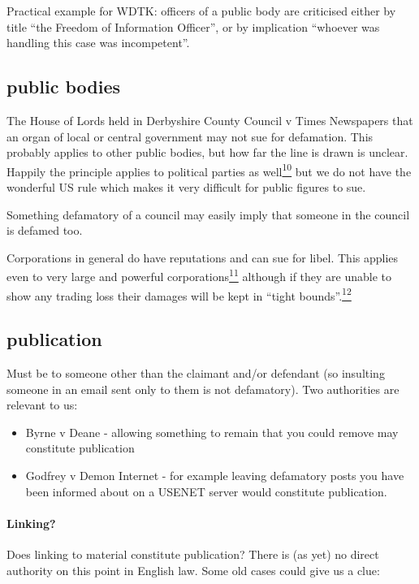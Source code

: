 \documentclass[]{article}
\begin{document}
Practical example for WDTK: officers of a public body are criticised
either by title ``the Freedom of Information Officer'', or by
implication ``whoever was handling this case was incompetent''.

\subsection{public bodies}

{The House of Lords held in Derbyshire County Council v Times Newspapers
that an organ of local or central government may not sue for defamation.
This probably applies to other public bodies, but how far the line is
drawn is unclear. Happily the principle applies to political parties as
well\hyperref[sdfootnote10sym]{\textsuperscript{10}} but we do not have
the wonderful US rule which makes it very difficult for public figures
to sue.}

Something defamatory of a council may easily imply that someone in the
council is defamed too.

{Corporations in general do have reputations and can sue for libel. This
applies even to very large and powerful
corporations\hyperref[sdfootnote11sym]{\textsuperscript{11}} although if
they are unable to show any trading loss their damages will be kept in
``tight bounds''.\hyperref[sdfootnote12sym]{\textsuperscript{12}} }

\subsection{publication}

Must be to someone other than the claimant and/or defendant (so
insulting someone in an email sent only to them is not defamatory). Two
authorities are relevant to us:

\begin{itemize}
\item
  Byrne v Deane - allowing something to remain that you could remove may
  constitute publication
\item
  Godfrey v Demon Internet - for example leaving defamatory posts you
  have been informed about on a USENET server would constitute
  publication.
\end{itemize}

\paragraph{Linking?}

Does linking to material constitute publication? There is (as yet) no
direct authority on this point in English law. Some old cases could give
us a clue:
\end{document}
